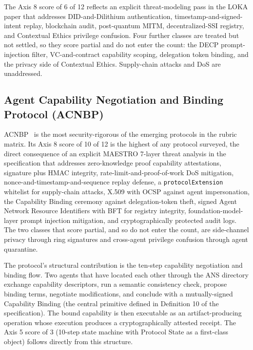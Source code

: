 The Axis 8 score of 6 of 12 reflects an explicit
threat-modeling pass in the LOKA paper that addresses
DID-and-Dilithium authentication, timestamp-and-signed-intent
replay, blockchain audit, post-quantum MITM,
decentralized-SSI registry, and Contextual Ethics privilege
confusion. Four further classes are treated but not settled,
so they score partial and do not enter the count: the DECP
prompt-injection filter, VC-and-contract capability scoping,
delegation token binding, and the privacy side of Contextual
Ethics. Supply-chain attacks and DoS are unaddressed.

\subsection{Agent Capability Negotiation and Binding Protocol (ACNBP)}
\label{sec:emerging:acnbp}

ACNBP~\cite{spec_acnbp} is the most security-rigorous of the
emerging protocols in the rubric matrix. Its Axis 8 score of
10 of 12 is the highest of any protocol surveyed, the
direct consequence of an explicit MAESTRO 7-layer threat
analysis in the specification that addresses zero-knowledge
proof capability attestations, signature plus HMAC
integrity, rate-limit-and-proof-of-work DoS mitigation,
nonce-and-timestamp-and-sequence replay defense, a
\texttt{protocolExtension} whitelist for supply-chain
attacks, X.509 with OCSP against agent impersonation, the
Capability Binding ceremony against delegation-token theft,
signed Agent Network Resource Identifiers with BFT for
registry integrity, foundation-model-layer prompt injection
mitigation, and cryptographically protected audit logs. The
two classes that score partial, and so do not enter the
count, are side-channel privacy through ring signatures and
cross-agent privilege confusion through agent quarantine.

The protocol's structural contribution is the ten-step
capability negotiation and binding flow. Two agents that
have located each other through the ANS directory
exchange capability descriptors, run a semantic
consistency check, propose binding terms, negotiate
modifications, and conclude with a mutually-signed
Capability Binding (the central primitive defined in
Definition 10 of the specification). The bound capability
is then executable as an artifact-producing operation
whose execution produces a cryptographically attested
receipt. The Axis 5 score of 3 (10-step state machine
with Protocol State as a first-class object) follows
directly from this structure.

